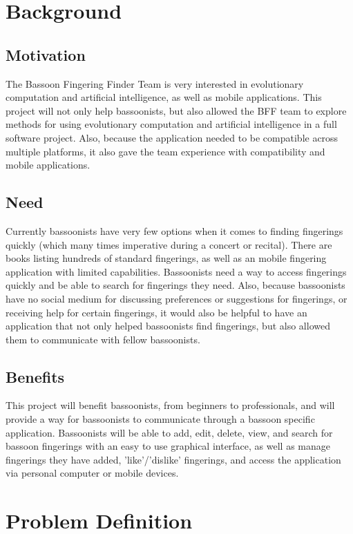 \documentclass[12pt,english]{article}
\begin{document}
\clearpage
\section{Background}

\subsection{Motivation}
The Bassoon Fingering Finder Team is very interested in evolutionary
computation and artificial intelligence, as well as mobile applications.
This project will not only help bassoonists, but also allowed the
BFF team to explore methods for using evolutionary computation and
artificial intelligence in a full software project. Also, because
the application needed to be compatible across multiple platforms,
it also gave the team experience with compatibility and mobile applications.


\subsection{Need}
Currently bassoonists have very few options when it comes to finding
fingerings quickly (which many times imperative during a concert or
recital). There are books listing hundreds of standard fingerings,
as well as an mobile fingering application with limited capabilities.
Bassoonists need a way to access fingerings quickly and be able to
search for fingerings they need. Also, because bassoonists have no
social medium for discussing preferences or suggestions for fingerings,
or receiving help for certain fingerings, it would also be helpful
to have an application that not only helped bassoonists find fingerings,
but also allowed them to communicate with fellow bassoonists.


\subsection{Benefits}
This project will benefit bassoonists, from beginners to professionals,
and will provide a way for bassoonists to communicate through a bassoon
specific application. Bassoonists will be able to add, edit, delete,
view, and search for bassoon fingerings with an easy to use graphical
interface, as well as manage fingerings they have added, 'like'/'dislike'
fingerings, and access the application via personal computer or mobile
devices.

\clearpage
\section{Problem Definition}
\end{document}
